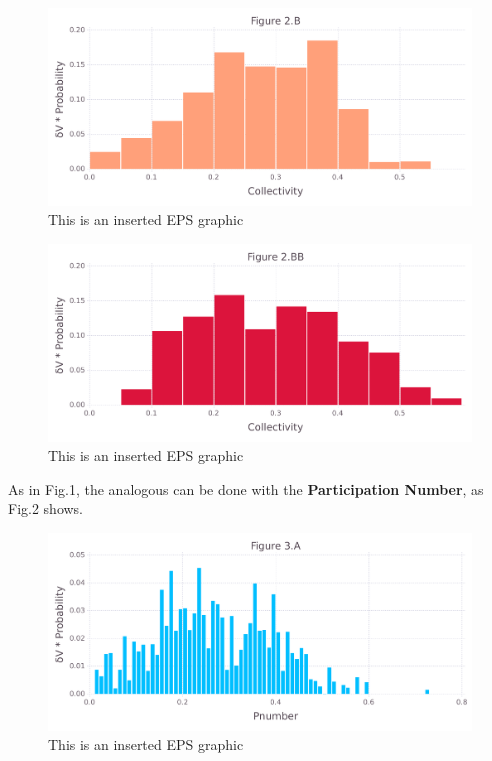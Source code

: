 \documentclass[10pt,letterpaper]{article}
\begin{document}
\begin{figure}[ht]
\begin{center}
\includegraphics[scale=0.5]{256l/2bfigure.pdf}
\caption{This is an inserted EPS graphic}
\label{fig5}
\end{center}
\end{figure}

\begin{figure}[ht]
\begin{center}
\includegraphics[scale=0.5]{256l/2bbfigure.pdf}
\caption{This is an inserted EPS graphic}
\label{fig6}
\end{center}
\end{figure}

\clearpage
As in Fig.1, the analogous can be done with the \textbf{Participation Number}, as Fig.2 shows.

\begin{figure}[ht]
\begin{center}
\includegraphics[scale=0.5]{256l/3afigure.pdf}
\caption{This is an inserted EPS graphic}
\label{fig7}
\end{center}
\end{figure}
\end{document}
